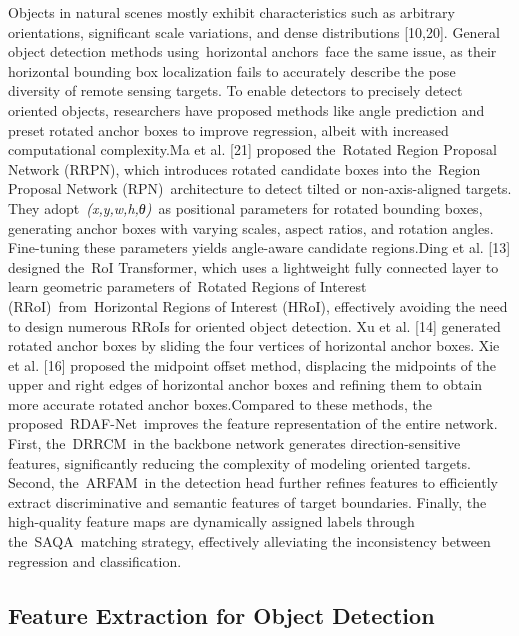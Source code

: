 \documentclass[10pt,twocolumn,final]{article}
\begin{document}
Objects in natural scenes mostly exhibit characteristics such as arbitrary orientations, significant scale variations, and dense distributions [10,20]. General object detection methods using horizontal anchors face the same issue, as their horizontal bounding box localization fails to accurately describe the pose diversity of remote sensing targets. To enable detectors to precisely detect oriented objects, researchers have proposed methods like angle prediction and preset rotated anchor boxes to improve regression, albeit with increased computational complexity.Ma et al. [21] proposed the Rotated Region Proposal Network (RRPN), which introduces rotated candidate boxes into the Region Proposal Network (RPN) architecture to detect tilted or non-axis-aligned targets. They adopt \textit{(x,y,w,h,θ)} as positional parameters for rotated bounding boxes, generating anchor boxes with varying scales, aspect ratios, and rotation angles. Fine-tuning these parameters yields angle-aware candidate regions.Ding et al. [13] designed the RoI Transformer, which uses a lightweight fully connected layer to learn geometric parameters of Rotated Regions of Interest (RRoI) from Horizontal Regions of Interest (HRoI), effectively avoiding the need to design numerous RRoIs for oriented object detection. Xu et al. [14] generated rotated anchor boxes by sliding the four vertices of horizontal anchor boxes. Xie et al. [16] proposed the midpoint offset method, displacing the midpoints of the upper and right edges of horizontal anchor boxes and refining them to obtain more accurate rotated anchor boxes.Compared to these methods, the proposed RDAF-Net improves the feature representation of the entire network. First, the DRRCM in the backbone network generates direction-sensitive features, significantly reducing the complexity of modeling oriented targets. Second, the ARFAM in the detection head further refines features to efficiently extract discriminative and semantic features of target boundaries. Finally, the high-quality feature maps are dynamically assigned labels through the SAQA matching strategy, effectively alleviating the inconsistency between regression and classification.

\subsection{ Feature Extraction for Object Detection }
\end{document}
